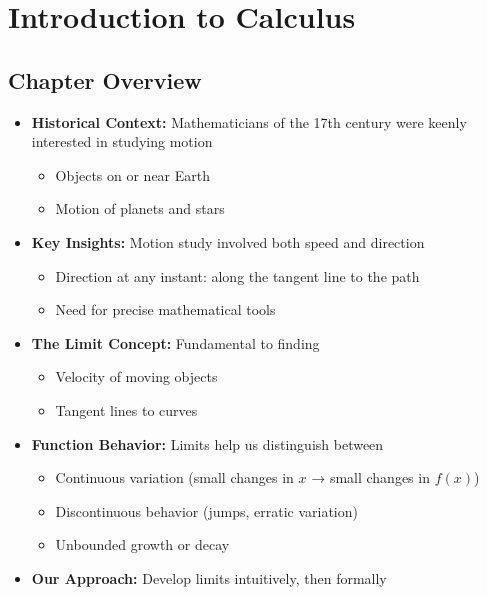 \chapter{Introduction to Calculus}

\section{Chapter Overview}
\begin{itemize}
    \item \textbf{Historical Context:} Mathematicians of the 17th century were keenly interested in studying motion
    \begin{itemize}
        \item Objects on or near Earth
        \item Motion of planets and stars
    \end{itemize}
    
    \item \textbf{Key Insights:} Motion study involved both speed and direction
    \begin{itemize}
        \item Direction at any instant: along the tangent line to the path
        \item Need for precise mathematical tools
    \end{itemize}
    
    \item \textbf{The Limit Concept:} Fundamental to finding
    \begin{itemize}
        \item Velocity of moving objects
        \item Tangent lines to curves
    \end{itemize}
    
    \item \textbf{Function Behavior:} Limits help us distinguish between
    \begin{itemize}
        \item Continuous variation (small changes in $x$ → small changes in $f(x)$)
        \item Discontinuous behavior (jumps, erratic variation)
        \item Unbounded growth or decay
    \end{itemize}
    
    \item \textbf{Our Approach:} Develop limits intuitively, then formally
\end{itemize}
